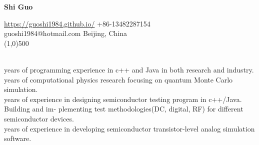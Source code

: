 \documentclass[11pt]{article} %
\begin{document}
 \centerline{\Large \bf Shi Guo}
  \noindent \url{https://guoshi1984.github.io/} \hspace{80mm}  +86-13482287154\\
    guoshi1984@hotmail.com \hspace{95mm}   Beijing, China\\
\line(1,0){500}


\vspace{2mm}

\\
 years of programming experience in c++ and Java in both research and industry.  \\
 years of computational physics research focusing on quantum Monte Carlo simulation. \\
 years of experience in designing semiconductor testing program in c++/Java. Building and im-
plementing test methodologies(DC, digital, RF) for different semiconductor devices.\\
 years of experience in developing semiconductor transistor-level analog simulation software.\\

\vspace{-2mm}


\vspace{0mm}
\end{document}
